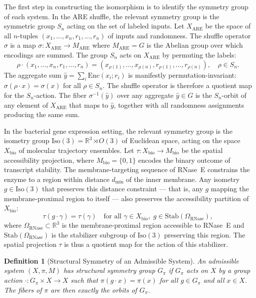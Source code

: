 \documentclass[12pt, a4paper]{article}
\theoremstyle{essaystyle}
\newtheorem{definition}{Definition}
\begin{document}
The first step in constructing the isomorphism is to identify the symmetry group of
each system. In the ARE shuffle, the relevant symmetry group is the symmetric group
$S_n$ acting on the set of labeled inputs. Let $X_{\mathrm{ARE}}$ be the space of
all $n$-tuples $(x_1, \ldots, x_n, r_1, \ldots, r_n)$ of inputs and randomness.
The shuffle operator $\sigma$ is a map $\sigma : X_{\mathrm{ARE}} \to M_{\mathrm{ARE}}$
where $M_{\mathrm{ARE}} = G$ is the Abelian group over which encodings are summed.
The group $S_n$ acts on $X_{\mathrm{ARE}}$ by permuting the labels:
\[
\rho \cdot (x_1, \ldots, x_n, r_1, \ldots, r_n)
= (x_{\rho(1)}, \ldots, x_{\rho(n)}, r_{\rho(1)}, \ldots, r_{\rho(n)}),
\quad \rho \in S_n.
\]
The aggregate sum $\hat{y} = \sum_i \mathrm{Enc}(x_i; r_i)$ is manifestly
permutation-invariant: $\sigma(\rho \cdot x) = \sigma(x)$ for all $\rho \in S_n$.
The shuffle operator is therefore a quotient map for the $S_n$-action. The fiber
$\sigma^{-1}(\hat{y})$ over any aggregate $\hat{y} \in G$ is the $S_n$-orbit of any
element of $X_{\mathrm{ARE}}$ that maps to $\hat{y}$, together with all randomness
assignments producing the same sum.

In the bacterial gene expression setting, the relevant symmetry group is the isometry
group $\mathrm{Iso}(3) = \mathbb{R}^3 \rtimes O(3)$ of Euclidean space, acting on the
space $X_{\mathrm{bio}}$ of molecular trajectory ensembles. Let $\tau : X_{\mathrm{bio}}
\to M_{\mathrm{bio}}$ be the spatial accessibility projection, where $M_{\mathrm{bio}}
= \{0, 1\}$ encodes the binary outcome of transcript stability. The membrane-targeting
sequence of RNase~E constrains the enzyme to a region within distance $d_{\min}$ of the
inner membrane. Any isometry $g \in \mathrm{Iso}(3)$ that preserves this distance
constraint --- that is, any $g$ mapping the membrane-proximal region to itself ---
also preserves the accessibility partition of $X_{\mathrm{bio}}$:
\[
\tau(g \cdot \gamma) = \tau(\gamma)
\quad \text{for all } \gamma \in X_{\mathrm{bio}},\; g \in \mathrm{Stab}(\Omega_{\mathrm{RNase}}),
\]
where $\Omega_{\mathrm{RNase}} \subset \mathbb{R}^3$ is the membrane-proximal region
accessible to RNase~E and $\mathrm{Stab}(\Omega_{\mathrm{RNase}})$ is the stabilizer
subgroup of $\mathrm{Iso}(3)$ preserving this region. The spatial projection $\tau$
is thus a quotient map for the action of this stabilizer.

\begin{definition}[Structural Symmetry of an Admissible System]
An admissible system $(X, \pi, M)$ has \emph{structural symmetry group} $G_\pi$ if
$G_\pi$ acts on $X$ by a group action $\cdot : G_\pi \times X \to X$ such that
$\pi(g \cdot x) = \pi(x)$ for all $g \in G_\pi$ and all $x \in X$. The fibers of $\pi$
are then exactly the orbits of $G_\pi$.
\end{definition}
\end{document}

